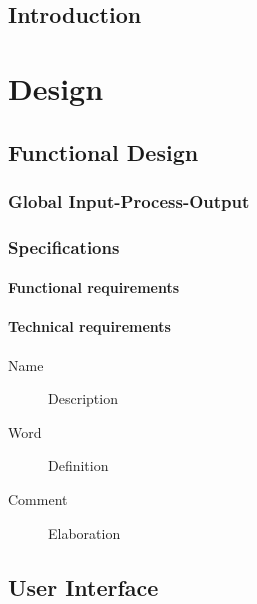 \documentclass[11pt,fleqn,,a4paper,twoside,openright]{book}
\begin{document}
\cleardoublepage %

\pagestyle{fancy} %

\chapter{Introduction}


\newpage
\part{Design}

\chapter{Functional Design}


\section{Global Input-Process-Output}


\section{Specifications}\label{Specification}


\subsection{Functional requirements}\label{FunctionalRequirements}


\subsection{Technical requirements}\label{TechnicalRequirements}
\begin{description}
\item[Name] Description
\item[Word] Definition
\item[Comment] Elaboration
\end{description}

\chapter{User Interface}\label{UserInterface}

\end{document}

